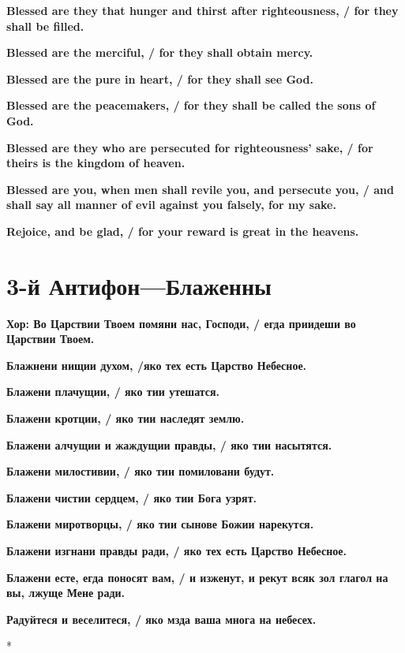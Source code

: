 \documentclass[12pt,a4paper,titlepage]{report}
\begin{document}
\begin{paracol}[1]{2}
  \textbf{Blessed are they that hunger and thirst after righteousness, / for they shall be filled.}

  \textbf{Blessed are the merciful, / for they shall obtain mercy.}

  \textbf{Blessed are the pure in heart, / for they shall see God.}

  \textbf{Blessed are the peacemakers, / for they shall be called the sons of God.}

  \textbf{Blessed are they who are persecuted for righteousness' sake, / for theirs is the kingdom of heaven.}

  \textbf{Blessed are you, when men shall revile you, and persecute you, / and shall say all manner of evil against you falsely, for my sake.}

  \textbf{Rejoice, and be glad, / for your reward is great in the heavens.}

  \switchcolumn[1]

  \section*{3-й Антифон---Блаженны}

  \textbf{Хор: Во Царствии Твоем помяни нас, Господи, / егда приидеши во Царствии Твоем.}

  \textbf{Блажнени нищии духом, /яко тех есть Царство Небесное.}

  \textbf{Блажени плачущии, / яко тии утешатся.}

  \textbf{Блажени кротции, / яко тии наследят землю.}

  \textbf{Блажени алчущии и жаждущии правды, / яко тии насытятся.}

  \textbf{Блажени милостивии, / яко тии помиловани будут.}

  \textbf{Блажени чистии сердцем, / яко тии Бога узрят.}

  \textbf{Блажени миротворцы, / яко тии сынове Божии нарекутся. }

  \textbf{Блажени изгнани правды ради, / яко тех есть Царство Небесное.}

  \textbf{Блажени есте, егда поносят вам, / и изженут, и рекут всяк зол глагол на вы, лжуще Мене ради. }

  \textbf{Радуйтеся и веселитеся, / яко мзда ваша многа на небесех.}

  \switchcolumn[0]*


\end{paracol}
\end{document}
